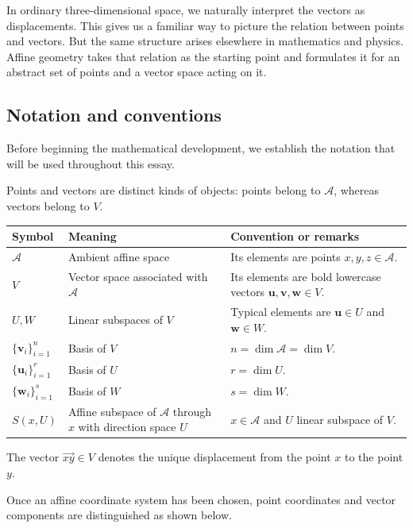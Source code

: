 \documentclass[12pt]{article}
\begin{document}
In ordinary three-dimensional space, we naturally interpret the
vectors as displacements. This gives us a familiar way to picture
the relation between points and vectors. But the same
structure arises elsewhere in mathematics and physics.  Affine geometry takes that
relation as the starting point and formulates it for an abstract set
of points and a vector space acting on it. 

\subsection{Notation and conventions}

Before beginning the mathematical development, we establish the notation
that will be used throughout this essay.

Points and vectors are distinct kinds of objects: points belong to
\(\mathcal A\), whereas vectors belong to \(V\).

\begin{center}
\begin{tabular}{lll}
Symbol & Meaning & Convention or remarks \\
\hline
\(\mathcal A\) & Ambient affine space & Its elements are points \(x,y,z\in\mathcal A\). \\
\(V\) & Vector space associated with \(\mathcal A\) & Its elements are bold lowercase vectors \(\mathbf u,\mathbf v,\mathbf w\in V\). \\
\(U,W\) & Linear subspaces of \(V\) & Typical elements are \(\mathbf u\in U\) and \(\mathbf w\in W\). \\
\(\{\mathbf v_i\}_{i=1}^{n}\) & Basis of \(V\) & \(n=\dim\mathcal A=\dim V\). \\
\(\{\mathbf u_i\}_{i=1}^{r}\) & Basis of \(U\) & \(r=\dim U\). \\
\(\{\mathbf w_i\}_{i=1}^{s}\) & Basis of \(W\) & \(s=\dim W\). \\
\(S(x,U)\) & Affine subspace of \(\mathcal A\) through \(x\) with direction space \(U\) & \(x\in\mathcal A\) and \(U\) linear subspace of \(V\). \\
\end{tabular}
\end{center}

The vector \(\overrightarrow{xy}\in V\) denotes the unique displacement
from the point \(x\) to the point \(y\).

Once an affine coordinate system has been chosen, point coordinates and
vector components are distinguished as shown below.
\end{document}
